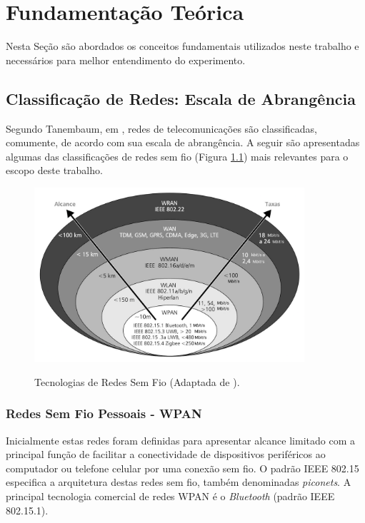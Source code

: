 \chapter{Fundamentação Teórica}
\label{fundamentacao}
Nesta Seção são abordados os conceitos fundamentais utilizados neste trabalho e necessários para melhor entendimento do experimento.

\section{Classificação de Redes: Escala de Abrangência}
\label{classRedes}
Segundo Tanembaum, em \cite{tanembaum2011}, redes de telecomunicações são classificadas, comumente, de acordo com sua escala de abrangência. A seguir são apresentadas algumas das classificações de redes sem fio (Figura \ref{fig:tecnologias_redes_semfiof}) mais relevantes para o escopo deste trabalho.

\begin{figure}[ht]
      \begin{center}
            \includegraphics[width=10cm]{./sections/textual/chapters/images/tecnologias_redes_semfio.png}\\
            \caption{Tecnologias de Redes Sem Fio (Adaptada de \cite{rochol2018sistemas}).}
            \label{fig:tecnologias_redes_semfiof}
      \end{center}
\end{figure}

\subsection{Redes Sem Fio Pessoais - WPAN}
Inicialmente estas redes foram definidas para apresentar alcance limitado com a principal função de facilitar a conectividade de dispositivos periféricos ao computador ou telefone celular por uma conexão sem fio. O padrão IEEE 802.15 especifica a arquitetura destas redes sem fio, também denominadas \emph{piconets}. A principal  tecnologia comercial de redes WPAN é o \emph{Bluetooth} (padrão IEEE 802.15.1).

